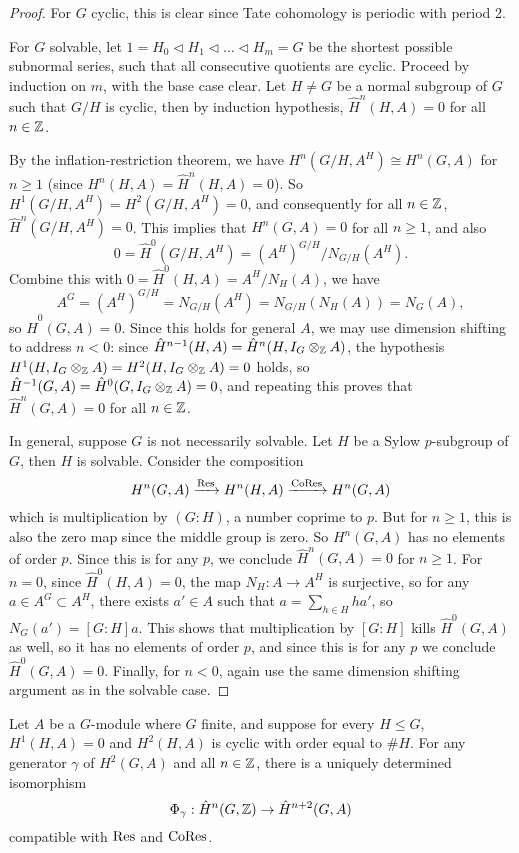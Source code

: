 \documentclass[11pt]{amsart}
\begin{document}
\begin{proof}
    For $G$ cyclic, this is clear since Tate cohomology is periodic with period 2.

    For $G$ solvable, let $1 = H_0\lhd H_1\lhd\dots \lhd H_m = G$ be the shortest possible subnormal series, such that all consecutive quotients are cyclic. Proceed by induction on $m$, with the base case clear. Let $H\neq G$ be a normal subgroup of $G$ such that $G/H$ is cyclic, then by induction hypothesis, $\hat{H}^n(H,A) = 0$ for all $n\in \mathbb{Z}$. 
    
    By the inflation-restriction theorem, we have $H^n(G/H, A^H) \cong H^n(G,A)$ for $n\ge 1$ (since $H^n(H,A) = \hat{H}^n(H,A) = 0$). So $H^1(G/H,A^H) = H^2(G/H,A^H) = 0$, and consequently for all $n\in\mathbb{Z}$, $\hat{H}^n(G/H, A^H) = 0$. This implies that $H^n(G,A) = 0$ for all $n\ge 1$, and also 
    \[0 = \hat{H}^0(G/H, A^H) = (A^H)^{G/H}/N_{G/H}(A^H).\]
    Combine this with
    $0 = \hat{H}^0(H,A) = A^H/N_H(A)$, we have
    \[A^G = (A^H)^{G/H} = N_{G/H}(A^H) = N_{G/H}(N_H(A)) = N_G(A),\]
    so $\hat{H}^0(G,A) = 0$. Since this holds for general $A$, we may use dimension shifting to address $n<0$: since $\hat{H}^{n-1}(H,A) = \hat{H}^n(H, I_G\otimes_{\mathbb{Z}} A)$, the hypothesis $H^1(H, I_G\otimes_{\mathbb{Z}} A) = H^2(H, I_G\otimes_{\mathbb{Z}} A) = 0$ holds, so $\hat{H}^{-1}(G,A) = \hat{H}^0(G, I_G\otimes_{\mathbb{Z}} A) = 0$, and repeating this proves that $\hat{H}^n(G,A) = 0$ for all $n\in\mathbb{Z}$.

    In general, suppose $G$ is not necessarily solvable. Let $H$ be a Sylow $p$-subgroup of $G$, then $H$ is solvable. Consider the composition
    \[H^n(G,A) \xrightarrow{\operatorname{Res}} H^n(H,A) \xrightarrow{\operatorname{CoRes}} H^n(G,A)\]
    which is multiplication by $(G:H)$, a number coprime to $p$. But for $n\ge 1$, this is also the zero map since the middle group is zero. So $H^n(G,A)$ has no elements of order $p$. Since this is for any $p$, we conclude $\hat{H}^n(G,A) = 0$ for $n\ge 1$. For $n=0$, since $\hat{H}^0(H,A) = 0$, the map $N_H: A\to A^H$ is surjective, so for any $a\in A^G\subset A^H$, there exists $a'\in A$ such that $a = \sum_{h\in H} ha'$, so $N_G(a') = [G:H]a$. This shows that multiplication by $[G:H]$ kills $\hat{H}^0(G,A)$ as well, so it has no elements of order $p$, and since this is for any $p$ we conclude $\hat{H}^0(G,A) = 0$. Finally, for $n < 0$, again use the same dimension shifting argument as in the solvable case.
\end{proof}


\begin{thm}
    Let $A$ be a $G$-module where $G$ finite, and suppose for every $H\le G$, $H^1(H,A) = 0$ and $H^2(H,A)$ is cyclic with order equal to $\#H$. For any generator $\gamma$ of $H^2(G,A)$ and all $n\in\mathbb{Z}$, there is a uniquely determined isomorphism
    \[\Phi_\gamma: \hat{H}^n(G,\mathbb{Z}) \to \hat{H}^{n+2}(G,A)\]
    compatible with $\operatorname{Res}$ and $\operatorname{CoRes}$.
\end{thm}
\end{document}
